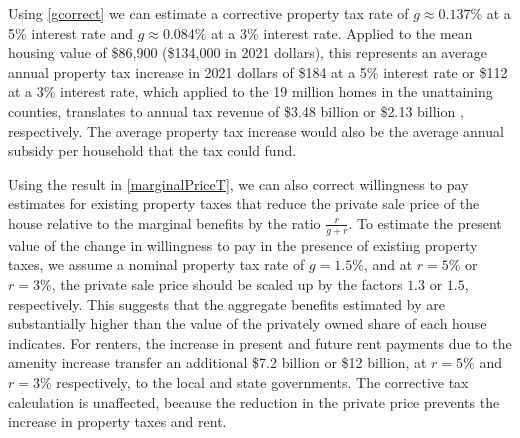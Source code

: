\documentclass[ecta,nameyear,draft]{econsocart}
\theoremstyle{plain}
\theoremstyle{remark}
\begin{document}
Using \ref{gcorrect} we can estimate a corrective property tax rate of $g\approx 0.137\%$ at a 5\% interest rate and $g\approx 0.084\%$ at a 3\% interest rate. Applied to the mean housing value of \$86,900 (\$134,000 in 2021 dollars), this represents an average annual property tax increase in 2021 dollars of \$184 at a 5\% interest rate or \$112 at a 3\% interest rate, which applied to the 19 million homes in the unattaining counties, translates to annual tax revenue of \$3.48 billion %
or \$2.13 billion 
, respectively. The average property tax increase would also be the average annual subsidy per household that the tax could fund. 

Using the result in \ref{marginalPriceT}, we can also correct willingness to pay estimates for existing property taxes that reduce the private sale price of the house relative to the marginal benefits by the ratio $\frac{r}{g+r}$. To estimate the present value of the change in willingness to pay in the presence of existing property taxes, we assume a nominal property tax rate of $g=1.5\%$, and at $r=5\%$ or $r=3\%$, the private sale price should be scaled up by the factors $1.3$ or $1.5$, respectively. This suggests that the aggregate benefits estimated by \cite{chaygreenstone05} are substantially higher than the value of the privately owned share of each house indicates. For renters, the increase in present and future rent payments due to the amenity increase transfer an additional \$7.2 billion or \$12 billion, at $r=5\%$ and $r=3\%$ respectively, to the local and state governments. The corrective tax calculation is unaffected, because the reduction in the private price prevents the increase in property taxes and rent.

\end{document}
